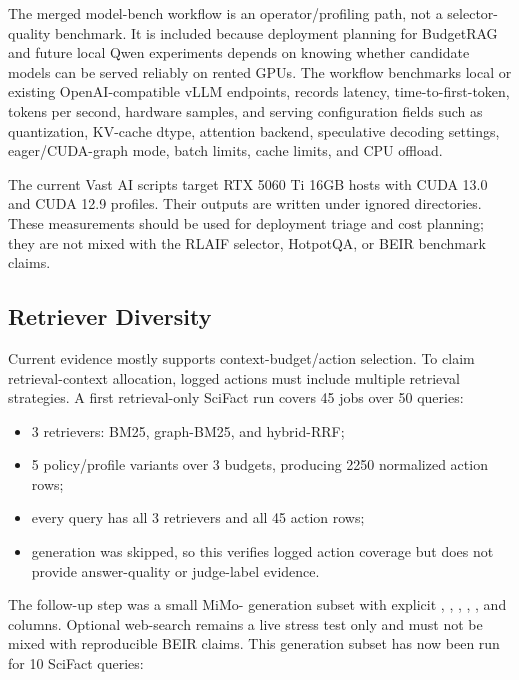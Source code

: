 The merged model-bench workflow is an operator/profiling path, not a selector-quality benchmark. It is included because deployment planning for BudgetRAG and future local Qwen experiments depends on knowing whether candidate models can be served reliably on rented GPUs. The workflow benchmarks local or existing OpenAI-compatible vLLM endpoints, records latency, time-to-first-token, tokens per second, hardware samples, and serving configuration fields such as quantization, KV-cache dtype, attention backend, speculative decoding settings, eager/CUDA-graph mode, batch limits, cache limits, and CPU offload.

The current Vast AI scripts target RTX 5060 Ti 16GB hosts with CUDA 13.0 and CUDA 12.9 profiles. Their outputs are written under ignored  directories. These measurements should be used for deployment triage and cost planning; they are not mixed with the RLAIF selector, HotpotQA, or BEIR benchmark claims.

\subsection{Retriever Diversity}

Current evidence mostly supports context-budget/action selection. To claim retrieval-context allocation, logged actions must include multiple retrieval strategies. A first retrieval-only SciFact run covers 45 jobs over 50 queries:

\begin{itemize}[leftmargin=*]
  \item 3 retrievers: BM25, graph-BM25, and hybrid-RRF;
  \item 5 policy/profile variants over 3 budgets, producing 2250 normalized action rows;
  \item every query has all 3 retrievers and all 45 action rows;
  \item generation was skipped, so this verifies logged action coverage but does not provide answer-quality or judge-label evidence.
\end{itemize}

The follow-up step was a small MiMo- generation subset with explicit , , , , , and  columns. Optional web-search remains a live stress test only and must not be mixed with reproducible BEIR claims. This generation subset has now been run for 10 SciFact queries:


